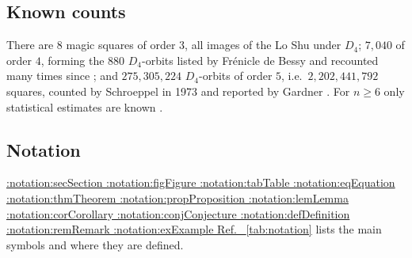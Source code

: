 \documentclass[11pt,a4paper]{article}
\makeatletter
\def\Cref@getprefix#1:#2\relax{#1}
\def\Cref@prefix@sec{sec}
\def\Cref@prefix@fig{fig}
\def\Cref@prefix@tab{tab}
\def\Cref@prefix@eq{eq}
\def\Cref@prefix@thm{thm}
\def\Cref@prefix@prop{prop}
\def\Cref@prefix@lem{lem}
\def\Cref@prefix@cor{cor}
\def\Cref@prefix@conj{conj}
\def\Cref@prefix@def{def}
\def\Cref@prefix@rem{rem}
\def\Cref@prefix@ex{ex}
\def\Cref@type@cap#1{%
  \edef\Cref@tmp{#1}%
  \ifx\Cref@tmp\Cref@prefix@sec Section%
  \else\ifx\Cref@tmp\Cref@prefix@fig Figure%
  \else\ifx\Cref@tmp\Cref@prefix@tab Table%
  \else\ifx\Cref@tmp\Cref@prefix@eq Equation%
  \else\ifx\Cref@tmp\Cref@prefix@thm Theorem%
  \else\ifx\Cref@tmp\Cref@prefix@prop Proposition%
  \else\ifx\Cref@tmp\Cref@prefix@lem Lemma%
  \else\ifx\Cref@tmp\Cref@prefix@cor Corollary%
  \else\ifx\Cref@tmp\Cref@prefix@conj Conjecture%
  \else\ifx\Cref@tmp\Cref@prefix@def Definition%
  \else\ifx\Cref@tmp\Cref@prefix@rem Remark%
  \else\ifx\Cref@tmp\Cref@prefix@ex Example%
  \else Ref.%
  \fi\fi\fi\fi\fi\fi\fi\fi\fi\fi\fi\fi
}
\DeclareRobustCommand{\Cref}[1]{%
  \begingroup
  \edef\Cref@label{#1}%
  \edef\Cref@prefix{\expandafter\Cref@getprefix\Cref@label:\relax}%
  \hyperref[#1]{\Cref@type@cap{\Cref@prefix}~\ref*{#1}}%
  \endgroup
}
\theoremstyle{plain}
\theoremstyle{definition}
\theoremstyle{remark}
\makeatother
\begin{document}
\subsection{Known counts}
\label{sec:bg_polytopes}

There are $8$ magic squares of order $3$, all images of the Lo Shu under $D_4$; $7{,}040$ of order $4$, forming the $880$ $D_4$-orbits listed by Fr\'enicle de Bessy \cite{frenicle1693} and recounted many times since \cite{beck2010enumeration}; and $275{,}305{,}224$ $D_4$-orbits of order $5$, i.e.\ $2{,}202{,}441{,}792$ squares, counted by Schroeppel in 1973 and reported by Gardner \cite{gardner1976}.
For $n\ge6$ only statistical estimates are known \cite{pinn1998number,trump2012enumeration}.

\subsection{Notation}
\label{sec:notation}

\Cref{tab:notation} lists the main symbols and where they are defined.
\end{document}

